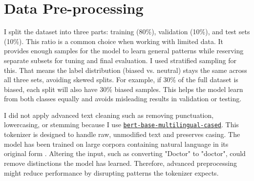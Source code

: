 

\section{Data Pre-processing}
    I split the dataset into three parts: training (80\%), validation (10\%), and test sets (10\%). This ratio is a common choice when working with limited data. It provides enough samples for the model to learn general patterns while reserving separate subsets for tuning and final evaluation. I used stratified sampling for this. That means the label distribution (biased vs. neutral) stays the same across all three sets, avoiding skewed splits. For example, if 30\% of the full dataset is biased, each split will also have 30\% biased samples. This helps the model learn from both classes equally and avoids misleading results in validation or testing.

    I did not apply advanced text cleaning such as removing punctuation, lowercasing, or stemming because I use \href{https://huggingface.co/google-bert/bert-base-multilingual-cased}{\texttt{bert-base-multilingual-cased}}. This tokenizer is designed to handle raw, unmodified text and preserves casing. The model has been trained on large corpora containing natural language in its original form \citep{devlinBERTPretrainingDeep2019}. Altering the input, such as converting "Doctor" to "doctor", could remove distinctions the model has learned. Therefore, advanced preprocessing might reduce performance by disrupting patterns the tokenizer expects.

